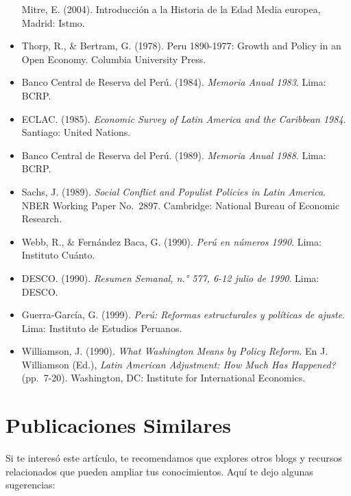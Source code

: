 \documentclass[
  jou,
  floatsintext,
  longtable,
  a4paper,
  nolmodern,
  notxfonts,
  notimes,
  colorlinks=true,linkcolor=blue,citecolor=blue,urlcolor=blue]{apa7}
\begin{document}
\begin{itemize}
  Mitre, E. (2004). Introducción a la Historia de la Edad Media europea,
  Madrid: Istmo.
\item
  Thorp, R., \& Bertram, G. (1978). Peru 1890-1977: Growth and Policy in
  an Open Economy. Columbia University Press.
\item
  Banco Central de Reserva del Perú. (1984). \emph{Memoria Anual 1983}.
  Lima: BCRP.
\item
  ECLAC. (1985). \emph{Economic Survey of Latin America and the
  Caribbean 1984}. Santiago: United Nations.
\item
  Banco Central de Reserva del Perú. (1989). \emph{Memoria Anual 1988}.
  Lima: BCRP.
\item
  Sachs, J. (1989). \emph{Social Conflict and Populist Policies in Latin
  America}. NBER Working Paper No.~2897. Cambridge: National Bureau of
  Economic Research.
\item
  Webb, R., \& Fernández Baca, G. (1990). \emph{Perú en números 1990}.
  Lima: Instituto Cuánto.
\item
  DESCO. (1990). \emph{Resumen Semanal, n.° 577, 6-12 julio de 1990}.
  Lima: DESCO.
\item
  Guerra-García, G. (1999). \emph{Perú: Reformas estructurales y
  políticas de ajuste}. Lima: Instituto de Estudios Peruanos.
\item
  Williamson, J. (1990). \emph{What Washington Means by Policy Reform}.
  En J. Williamson (Ed.), \emph{Latin American Adjustment: How Much Has
  Happened?} (pp.~7-20). Washington, DC: Institute for International
  Economics.
\end{itemize}

\section{Publicaciones Similares}\label{publicaciones-similares}

Si te interesó este artículo, te recomendamos que explores otros blogs y
recursos relacionados que pueden ampliar tus conocimientos. Aquí te dejo
algunas sugerencias:
\end{document}
